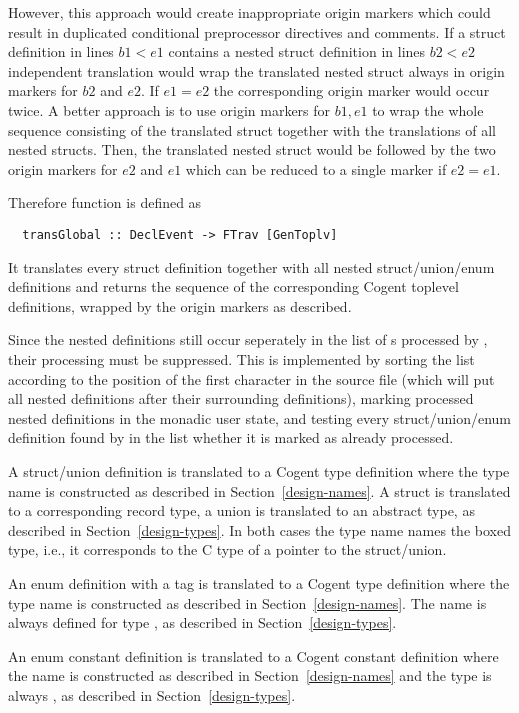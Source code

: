 However, this approach would create inappropriate origin markers which could result in duplicated conditional preprocessor
directives and comments. If a struct definition in lines $b1 < e1$ contains a nested struct definition in lines $b2 < e2$
independent translation would wrap the translated nested struct always in origin markers for $b2$ and $e2$. If $e1 = e2$
the corresponding origin marker would occur twice. A better approach is to use origin markers for $b1, e1$ to wrap the 
whole sequence consisting of the translated struct together with the translations of all nested structs. Then, the translated
nested struct would be followed by the two origin markers for $e2$ and $e1$ which can be reduced to a single marker if
$e2 = e1$.

Therefore function  is defined as
\begin{verbatim}
  transGlobal :: DeclEvent -> FTrav [GenToplv]
\end{verbatim}
It translates every struct definition together with all nested struct/union/enum definitions and returns the sequence of 
the corresponding Cogent toplevel definitions, wrapped by the origin markers as described.

Since the nested definitions still occur seperately in the list of s processed by , their processing
must be suppressed. This is implemented by sorting the list according to the position of the first character in the source file
(which will put all nested definitions after their surrounding definitions), marking processed nested definitions in the 
monadic user state, and testing every struct/union/enum definition found by  in the  list 
whether it is marked as already processed.

A struct/union definition is translated to a Cogent type definition where the type name is constructed as described 
in Section~\ref{design-names}. A struct is translated to a corresponding record type, a union is translated to an 
abstract type, as described in Section~\ref{design-types}.
In both cases the type name names the boxed type, i.e., it corresponds to the C type of a pointer to the struct/union.

An enum definition with a tag is translated to a Cogent type definition where the type name is constructed as described 
in Section~\ref{design-names}. The name is always defined for type , as described in Section~\ref{design-types}.

An enum constant definition is translated to a Cogent constant definition where the name is constructed as described 
in Section~\ref{design-names} and the type is always , as described in Section~\ref{design-types}.

